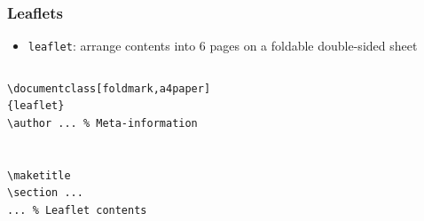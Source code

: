 \begin{frame}[fragile]
\frametitle{Leaflets}

\begin{itemize}
\item \texttt{leaflet}: arrange contents into 6 pages on a foldable double-sided sheet
\end{itemize}

\begin{columns}
\begin{column}{.496\textwidth}
\begin{beamerboxesrounded}[width=\linewidth]{}
\begin{lstlisting}[basicstyle=\ttfamily\small,lineskip=-2pt,emph={leaflet},moretexcs={maketitle}]
\documentclass[foldmark,a4paper]
{leaflet}
\author ... % Meta-information


\maketitle
\section ...
... % Leaflet contents


\end{lstlisting}
\end{beamerboxesrounded}
\end{column}
\end{columns}
\end{frame}
